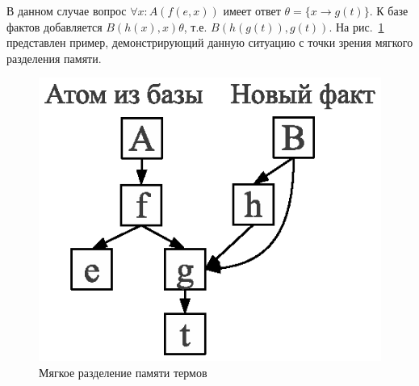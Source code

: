 В данном случае вопрос $\forall x:A(f(e,x))$ имеет ответ $\theta = \{x \rightarrow g(t)\}$. К базе фактов добавляется $B(h(x),x)\theta$, т.е. $B(h(g(t)),g(t))$. На рис.~\ref{fig:datasharing1} представлен пример, демонстрирующий данную ситуацию с точки зрения мягкого разделения памяти.
\begin{figure}[h]
	\centering
	\includegraphics[width=0.3\linewidth]{pics/DataSharing1.eps}
	\caption{Мягкое разделение памяти термов}
	\label{fig:datasharing1}
\end{figure}

